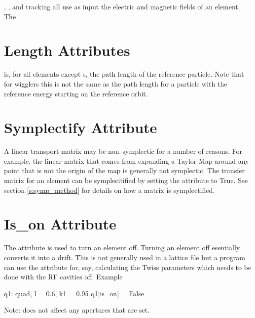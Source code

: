 , , and  tracking all use
as input the electric and magnetic fields of an element. The


\section{Length Attributes}
\label{s:l}

 is, for all elements except s, the path length 
of the reference particle.
Note that for wigglers this is not the same as the path length for
a particle with the reference energy starting on the reference orbit.

\section{Symplectify Attribute}
\label{s:symp}

A linear transport matrix may be non--symplectic for a number of reasons.
For example, the linear matrix that comes from expanding a Taylor Map
around any point that is not the origin of the map is generally not 
symplectic. The transfer matrix for an element can be symplecitified by
setting the  attribute to True. See section \ref{s:symp_method}
for details on how a matrix is symplectified.


\section{Is\_on Attribute}
\label{s:is_on}

The  attribute is used to turn an element off. Turning
an element off esentially converts it into a drift. This is not
generally used in a lattice file but a program can use the attribute
for, say, calculating the Twiss parameters which needs to be done
with the RF cavities off. Example
\begin{example}
  q1: quad, l = 0.6, k1 = 0.95
  q1[is_on] = False
\end{example}
Note:  does not affect any apertures that are set.